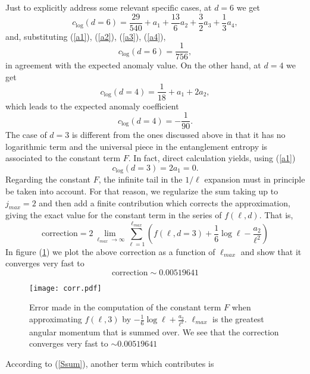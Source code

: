 \documentclass[12pt,a4paper]{article}
\begin{document}
Just to explicitly address some relevant specific cases, at $d=6$ we get
\begin{equation}
c_{\text{log}}(d=6)=\frac{29}{540} + a_1 + \frac{13}{6} a_2 + \frac{3}{2} a_3 + \frac{1}{3} a_4,
\end{equation}
and, substituting (\ref{a1}), (\ref{a2}), (\ref{a3}), (\ref{a4}), 
\begin{equation}
c_{\text{log}}(d=6)=\frac{1}{756},
\end{equation}
in agreement with the expected anomaly value. On the other hand, at $d=4$ we get
\begin{equation}
c_{\text{log}}(d=4)=\frac{1}{18} + a_1 + 2 a_2 ,
\end{equation}
which leads to the expected anomaly coefficient
\begin{equation}
c_{\text{log}}(d=4)=-\frac{1}{90}.
\end{equation}
The case of $d=3$ is different from the ones discussed above in that it has no logarithmic term and the universal piece in the entanglement entropy is associated to the constant term $F$. In fact, direct calculation yields, using (\ref{a1})
\begin{equation}
c_{\text{log}}(d=3)=2 a_1 =0.
\end{equation}
Regarding the constant $F$, the infinite tail in the $1/\ell$ expansion must in principle be taken into account. For that reason, we regularize the sum taking up to $j_{max}=2$ and then add a finite contribution which corrects the approximation, giving the exact value for the constant term in the series of $f(\ell,d)$. That is, 
\begin{equation}
\text{correction}=2\lim\limits_{\ell_{max}\rightarrow \infty}\sum_{\ell=1}^{\ell_{max}}\left(f(\ell, d=3)+\frac{1}{6}\log{\ell} - \frac{a_2}{\ell^2}\right)
\end{equation}
In figure (\ref{corr}) we plot the above correction as a function of $\ell_{max}$ and show that it converges very fast to
\begin{equation}
\text{correction}\sim 0.00519641
\end{equation}
\begin{figure}
\begin{center}  
\texttt{[image: corr.pdf]}
\caption{Error made in the computation of the constant term $F$ when approximating $f(\ell,3)$ by $-\frac{1}{6}\log{\ell}+\frac{a_2}{\ell^2}$. $\ell_{max}$ is the greatest angular momentum that is summed over. We see that the correction converges very fast to $\sim 0.00519641$}
\label{corr}
\end{center}  
\end{figure}
According to (\ref{Ssum}), another term which contributes is 
\end{document}
